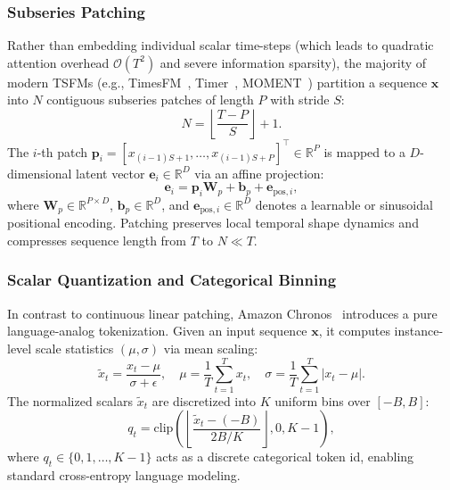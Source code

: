\subsubsection{Subseries Patching}
Rather than embedding individual scalar time-steps (which leads to quadratic attention overhead $\mathcal{O}(T^2)$ and severe information sparsity), the majority of modern TSFMs (e.g., TimesFM~\cite{das2024timesfm}, Timer~\cite{liu2024timer}, MOMENT~\cite{goswami2024moment}) partition a sequence $\mathbf{x}$ into $N$ contiguous subseries patches of length $P$ with stride $S$:
\begin{equation}
    N = \left\lfloor \frac{T - P}{S} \right\rfloor + 1.
\end{equation}
The $i$-th patch $\mathbf{p}_i = [x_{(i-1)S + 1}, \dots, x_{(i-1)S + P}]^\top \in \mathbb{R}^P$ is mapped to a $D$-dimensional latent vector $\mathbf{e}_i \in \mathbb{R}^D$ via an affine projection:
\begin{equation}
    \mathbf{e}_i = \mathbf{p}_i \mathbf{W}_p + \mathbf{b}_p + \mathbf{e}_{\text{pos}, i},
\end{equation}
where $\mathbf{W}_p \in \mathbb{R}^{P \times D}$, $\mathbf{b}_p \in \mathbb{R}^D$, and $\mathbf{e}_{\text{pos}, i} \in \mathbb{R}^D$ denotes a learnable or sinusoidal positional encoding. Patching preserves local temporal shape dynamics and compresses sequence length from $T$ to $N \ll T$.

\subsubsection{Scalar Quantization and Categorical Binning}
In contrast to continuous linear patching, Amazon Chronos~\cite{ansari2024chronos} introduces a pure language-analog tokenization. Given an input sequence $\mathbf{x}$, it computes instance-level scale statistics $(\mu, \sigma)$ via mean scaling:
\begin{equation}
    \widetilde{x}_t = \frac{x_t - \mu}{\sigma + \epsilon}, \quad \mu = \frac{1}{T}\sum_{t=1}^T x_t, \quad \sigma = \frac{1}{T}\sum_{t=1}^T |x_t - \mu|.
\end{equation}
The normalized scalars $\widetilde{x}_t$ are discretized into $K$ uniform bins over $[-B, B]$:
\begin{equation}
    q_t = \text{clip}\left(\left\lfloor \frac{\widetilde{x}_t - (-B)}{2B / K} \right\rfloor, 0, K - 1\right),
\end{equation}
where $q_t \in \{0, 1, \dots, K-1\}$ acts as a discrete categorical token id, enabling standard cross-entropy language modeling.

